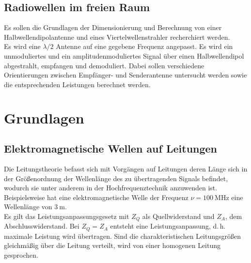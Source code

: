 \documentclass[a4paper,twoside,final]{article}
\begin{document}
\subsection{Radiowellen im freien Raum}
Es sollen die Grundlagen der Dimensionierung und Berechnung von einer Halbwellendipolantenne und eines Viertelwellenstrahler recherchiert werden.\\
Es wird eine $\lambda / 2$ Antenne auf eine gegebene Frequenz angepasst. Es wird ein unmoduliertes und ein amplitudenmoduliertes Signal über einen Halbwellendipol abgestrahlt, empfangen und demoduliert. Dabei sollen verschiedene Orientierungen zwischen Empfänger- und Senderantenne untersucht werden sowie die entsprechenden Leistungen berechnet werden.
\newpage
\section{Grundlagen} \label{sec:Grundlagen}

\subsection{Elektromagnetische Wellen auf Leitungen}
Die Leitungstheorie befasst sich mit Vorgängen auf Leitungen deren Länge sich in der Größenordnung der Wellenlänge
des zu übertragenden Signals befindet, wodurch sie unter anderem in der Hochfrequenztechnik anzuwenden ist. Beispielsweise hat eine elektromagnetische Welle der Frequenz $\nu = \SI{100}{\mega\hertz}$ eine Wellenlänge von $\SI{3}{\metre}$. \\
Es gilt das Leistungsanpassungsgesetz mit $Z_Q$ als Quellwiderstand und $Z_A$, dem Abschlusswiderstand. Bei $Z_Q = Z_A$ entsteht eine Leistungsanpassung, d.\,h. maximale Leistung wird übertragen. Sind die charakteristischen Leitungsgrößen gleichmäßig über die Leitung verteilt, wird von einer homogenen Leitung gesprochen.
\end{document}
